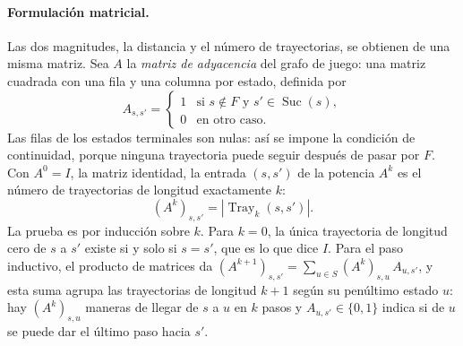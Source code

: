 \paragraph{Formulación matricial.} Las dos magnitudes, la distancia y el número de trayectorias, se obtienen de una misma matriz. Sea $A$ la \emph{matriz de adyacencia} del grafo de juego: una matriz cuadrada con una fila y una columna por estado, definida por
\begin{equation}
    A_{s, s'} =
    \begin{cases}
        1 & \text{si } s \notin F \text{ y } s' \in \operatorname{Suc}(s),\\
        0 & \text{en otro caso}.
    \end{cases}
    \label{eq:an_adyacencia}
\end{equation}
Las filas de los estados terminales son nulas: así se impone la condición de continuidad, porque ninguna trayectoria puede seguir después de pasar por $F$. Con $A^0 = I$, la matriz identidad, la entrada $(s, s')$ de la potencia $A^k$ es el número de trayectorias de longitud exactamente $k$:
\begin{equation}
    (A^k)_{s, s'} = |\operatorname{Tray}_k(s, s')|.
    \label{eq:an_potencias}
\end{equation}
La prueba es por inducción sobre $k$. Para $k = 0$, la única trayectoria de longitud cero de $s$ a $s'$ existe si y solo si $s = s'$, que es lo que dice $I$. Para el paso inductivo, el producto de matrices da $(A^{k+1})_{s,s'} = \sum_{u \in S} (A^k)_{s,u}\, A_{u,s'}$, y esta suma agrupa las trayectorias de longitud $k+1$ según su penúltimo estado $u$: hay $(A^k)_{s,u}$ maneras de llegar de $s$ a $u$ en $k$ pasos y $A_{u,s'} \in \{0, 1\}$ indica si de $u$ se puede dar el último paso hacia $s'$.

